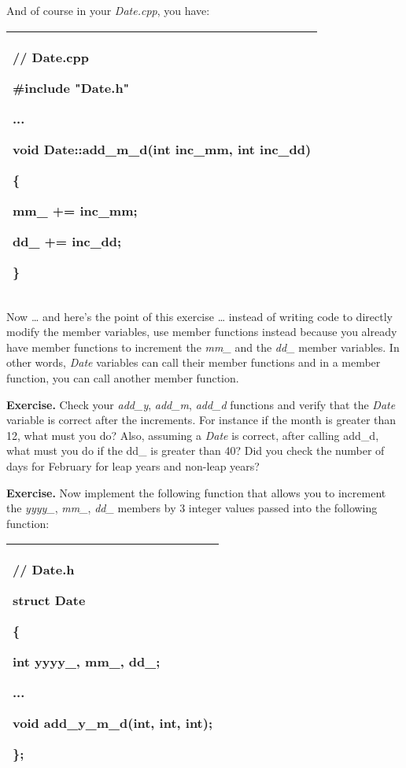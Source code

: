 \documentclass[
]{article}
\begin{document}
And of course in your \emph{Date.cpp}, you have:

\begin{longtable}[]{@{}l@{}}
\toprule
\endhead
\begin{minipage}[t]{0.97\columnwidth}\raggedright
// Date.cpp

\#include "Date.h"

...

void Date::add\_m\_d(int inc\_mm, int inc\_dd)

\{

mm\_ += inc\_mm;

dd\_ += inc\_dd;

\}\strut
\end{minipage}\tabularnewline
\bottomrule
\end{longtable}

Now \ldots{} and here's the point of this exercise \ldots{} instead of
writing code to directly modify the member variables, use member
functions instead because you already have member functions to increment
the \emph{mm\_} and the \emph{dd\_} member variables. In other words,
\emph{Date} variables can call their member functions and in a member
function, you can call another member function.

\textbf{Exercise.} Check your \emph{add\_y}, \emph{add\_m},
\emph{add\_d} functions and verify that the \emph{Date} variable is
correct after the increments. For instance if the month is greater than
12, what must you do? Also, assuming a \emph{Date} is correct, after
calling add\_d, what must you do if the dd\_ is greater than 40? Did you
check the number of days for February for leap years and non-leap years?

\textbf{Exercise. }Now implement the following function that allows you
to increment the \emph{yyyy\_}, \emph{mm\_}, \emph{dd\_} members by 3
integer values passed into the following function:

\begin{longtable}[]{@{}l@{}}
\toprule
\endhead
\begin{minipage}[t]{0.97\columnwidth}\raggedright
// Date.h

struct Date

\{

int yyyy\_, mm\_, dd\_;

...

void add\_y\_m\_d(int, int, int);

\};\strut
\end{minipage}\tabularnewline
\bottomrule
\end{longtable}
\end{document}
